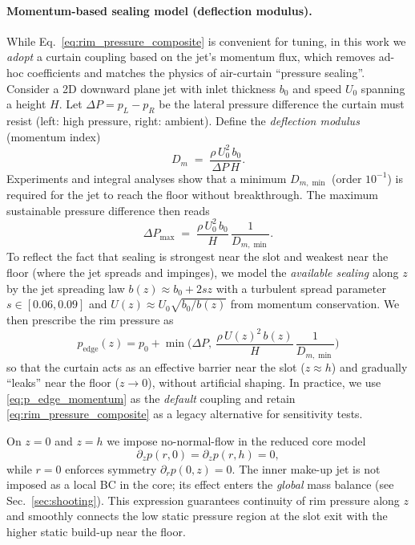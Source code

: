 \documentclass[11pt,a4paper]{article}
\begin{document}
\paragraph{Momentum-based sealing model (deflection modulus).}
While Eq.~\eqref{eq:rim_pressure_composite} is convenient for tuning, in this work we
\emph{adopt} a curtain coupling based on the jet's momentum flux, which removes ad-hoc coefficients and matches the physics of air-curtain ``pressure sealing''. 
Consider a 2D downward plane jet with inlet thickness $b_0$ and speed $U_0$ spanning a height $H$. 
Let $\Delta P\!=\!p_L-p_R$ be the lateral pressure difference the curtain must resist (left: high pressure, right: ambient).
Define the \emph{deflection modulus} (momentum index)
\[
D_m \;=\; \frac{\rho\,U_0^2\,b_0}{\Delta P\,H}.
\]
Experiments and integral analyses show that a minimum $D_{m,\min}$ (order $10^{-1}$) is required for the jet to reach the floor without breakthrough. 
The maximum sustainable pressure difference then reads
\[
\Delta P_{\max} \;=\; \frac{\rho\,U_0^2\,b_0}{H}\,\frac{1}{D_{m,\min}}.
\]
To reflect the fact that sealing is strongest near the slot and weakest near the floor (where the jet spreads and impinges), we model the \emph{available sealing} along $z$ by the jet spreading law $b(z)\approx b_0+2 s z$ with a turbulent spread parameter $s\in[0.06,0.09]$ and $U(z)\approx U_0\sqrt{b_0/b(z)}$ from momentum conservation. 
We then prescribe the rim pressure as
\begin{equation}
  \boxed{\,p_{\mathrm{edge}}(z)=p_0 + \min\!\Big(\Delta P,\ \frac{\rho\,U(z)^2\,b(z)}{H}\,\frac{1}{D_{m,\min}}\Big)\,}
  \label{eq:p_edge_momentum}
\end{equation}
so that the curtain acts as an effective barrier near the slot ($z\!\approx\!h$) and gradually ``leaks'' near the floor ($z\!\to\!0$), without artificial shaping. 
In practice, we use \eqref{eq:p_edge_momentum} as the \emph{default} coupling and retain \eqref{eq:rim_pressure_composite} as a legacy alternative for sensitivity tests.



On $z=0$ and $z=h$ we impose no-normal-flow in the reduced core model
\begin{equation}
  \partial_z p(r,0)=\partial_z p(r,h)=0,
\end{equation}
while $r=0$ enforces symmetry $\partial_r p(0,z)=0$. The inner make-up jet is not
imposed as a local BC in the core; its effect enters the \emph{global} mass balance
(see Sec.~\ref{sec:shooting}).
This expression guarantees continuity of rim pressure along $z$ and smoothly connects
the low static pressure region at the slot exit with the higher static build-up near the
floor.
\end{document}
